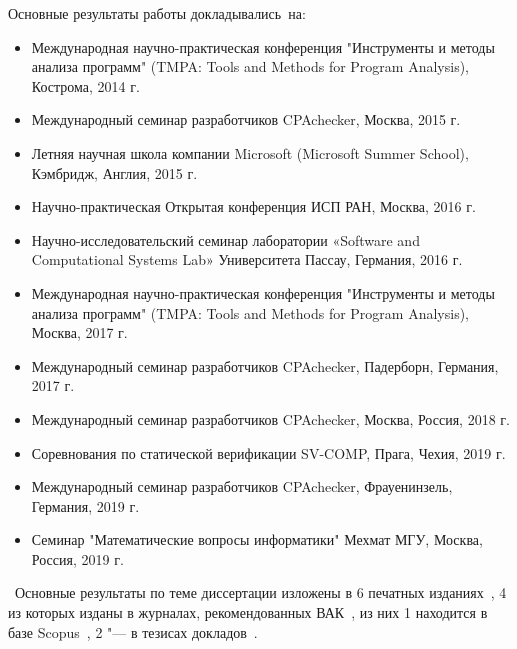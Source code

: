 
{\probation}
Основные результаты работы докладывались~на:
\begin{itemize}
  \item Международная научно-практическая конференция "Инструменты и методы анализа программ" (TMPA: Tools and Methods for Program Analysis), Кострома, 2014 г.
  \item Международный семинар разработчиков CPAchecker, Москва, 2015 г.
  \item Летняя научная школа компании Microsoft (Microsoft Summer School), Кэмбридж, Англия, 2015 г.
  \item Научно-практическая Открытая конференция ИСП РАН, Москва, 2016 г.
  \item Научно-исследовательский семинар лаборатории «Software and Computational Systems Lab» Университета Пассау, Германия, 2016 г.
  \item Международная научно-практическая конференция "Инструменты и методы анализа программ" (TMPA: Tools and Methods for Program Analysis), Москва, 2017 г.
  \item Международный семинар разработчиков CPAchecker, Падерборн, Германия, 2017 г.
  \item Международный семинар разработчиков CPAchecker, Москва, Россия, 2018 г.
  \item Соревнования по статической верификации SV-COMP, Прага, Чехия, 2019 г.
  \item Международный семинар разработчиков CPAchecker, Фрауенинзель, Германия, 2019 г.
  \item Семинар "Математические вопросы информатики" Мехмат МГУ, Москва, Россия, 2019 г.
\end{itemize}


\publications\ Основные результаты по теме диссертации изложены в 6 печатных изданиях~\cite{lockatorVAK,lockatorVAK2,TMPA2017,theoryVAK,lockatorSyrcose,lockatorTMPA}, 
    4 из которых изданы в журналах, рекомендованных ВАК~\cite{lockatorVAK,lockatorVAK2,TMPA2017,theoryVAK}, из них 1 находится в базе Scopus~\cite{TMPA2017},
    2 "--- в тезисах докладов~\cite{lockatorSyrcose,lockatorTMPA}.


